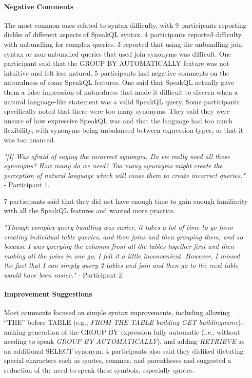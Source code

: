 \paragraph{\textbf{Negative Comments}}
The most common ones related to syntax difficulty, with 9 participants reporting dislike of different aspects of SpeakQL syntax. 
4 participants reported difficulty with unbundling for complex queries. 
3 reported that using the unbundling join syntax or non-unbundled queries that used join synonyms was difficult. 
One participant said that the GROUP BY AUTOMATICALLY feature was not intuitive and felt less natural.
5 participants had negative comments on the naturalness of some SpeakQL features. 
One said that SpeakQL actually gave them a false impression of naturalness that made it difficult to discern when a natural language-like statement was a valid SpeakQL query. 
Some participants specifically noted that there were too many synonyms. 
They said they were unsure of how expressive SpeakQL was and that the language had too much flexibility, with synonyms being unbalanced between expression types, or that it was too nuanced. 

\vspace{1mm}
\emph{"[I] Was afraid of saying the incorrect synonym. Do we really need all these synonyms? How many do we need? Too many synonyms might create the perception of natural language which will cause them to create incorrect queries."}
- Participant 1.

\vspace{1mm}
7 participants said that they did not have enough time to gain enough familiarity with all the SpeakQL features and  wanted more practice. 

\vspace{1mm}
\emph{"Though complex query bundling was easier, it takes a lot of time to go from creating individual table queries, and then joins and then grouping them, and so because I was querying the columns from all the tables together first and then making all the joins in one go, I felt it a little inconvenient. However, I missed the fact that I can simply query 2 tables and join and then go to the next table would have been easier."}
- Participant 2.

\paragraph{\textbf{Improvement Suggestions}} 
Most comments focused on simple syntax improvements, including allowing ``THE'' before TABLE (e.g., \emph{FROM THE TABLE building GET buildingname}), making generation of the GROUP BY expression fully automatic (i.e., without needing to speak \emph{GROUP BY AUTOMATICALLY}), and adding \emph{RETRIEVE} as an additional SELECT synonym. 
4 participants also said they disliked dictating special characters such as quotes, commas, and parentheses and suggested a reduction of the need to speak these symbols, especially quotes.



